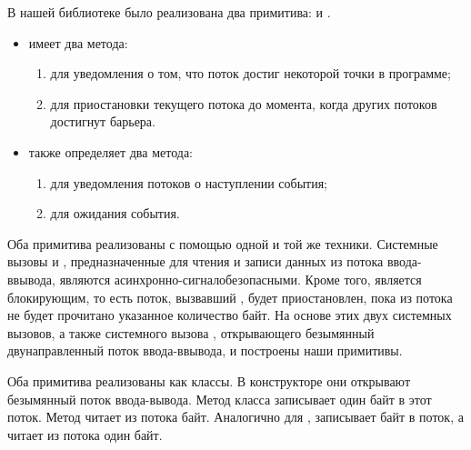 В нашей библиотеке было реализована два примитива:  и 
. 

\begin{itemize}
\item 
     имеет два метода:
    \begin{enumerate}
    \item 
         для уведомления о том, что поток достиг некоторой точки в программе;
    \item 
         для приостановки текущего потока до момента, когда  
        других потоков достигнут барьера.
    \end{enumerate}
\item 
     также определяет два метода:
    \begin{enumerate}
    \item 
         для уведомления  потоков о наступлении события;
    \item 
         для ожидания события.
    \end{enumerate}
\end{itemize}

Оба примитива реализованы с помощью одной и той же техники. 
Системные вызовы  и , предназначенные для чтения и записи данных из 
потока ввода-ввывода, являются асинхронно-сигналобезопасными. 
Кроме того,  является блокирующим, то есть поток, вызвавший , 
будет приостановлен, пока из потока не будет прочитано указанное количество байт. 
На основе этих двух системных вызовов, а также системного вызова , 
открывающего безымянный двунаправленный поток ввода-ввывода, и построены наши примитивы. 

Оба примитива реализованы как классы. 
В конструкторе они открывают безымянный поток ввода-вывода. 
Метод  класса  записывает один байт в этот поток. 
Метод  читает из потока  байт. 
Аналогично для ,  записывает  байт 
в поток, а  читает из потока один байт.

